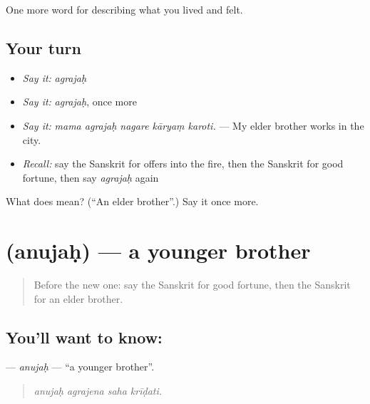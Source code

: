 \begin{grammarlens}[title={What you've built}]
One more word for describing what you lived and felt.
\end{grammarlens}

\subsection*{Your turn}
\begin{itemize}
\raggedright
  \item \emph{Say it:} \emph{agrajaḥ}
  \item \emph{Say it:} \emph{agrajaḥ}, once more
  \item \emph{Say it:} \emph{mama agrajaḥ nagare kāryaṃ karoti.} — My elder brother works in the city.
  \item \emph{Recall:} say the Sanskrit for offers into the fire, then the Sanskrit for good fortune, then say \emph{agrajaḥ} again
\end{itemize}

\begin{tcolorbox}[breakable,colback=teal!4,colframe=teal!35!black,title={Before you move on}]
What does  mean? (\textquotedblleft{}An elder brother\textquotedblright{}.) Say it once more.
\end{tcolorbox}
\section[\texorpdfstring{\sk{अनुजः} (anujaḥ)}{अनुजः (anujaḥ)}]{ (anujaḥ) — a younger brother}

\label{lesson:SA-C498-anujah}



\begin{quote}
Before the new one: say the Sanskrit for good fortune, then the Sanskrit for an elder brother.
\end{quote}

\subsection*{You'll want to know: }
\textbf{} — \emph{anujaḥ} — \textquotedblleft{}a younger brother\textquotedblright{}.

\begin{quote}
   
\end{quote}

\begin{quote}
\emph{anujaḥ agrajena saha krīḍati.}
\end{quote}

